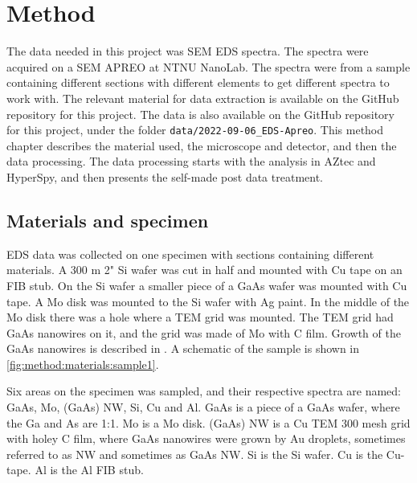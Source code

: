 \chapter{Method}
\label{chap:method}




The data needed in this project was SEM EDS spectra.
The spectra were acquired on a SEM APREO at NTNU NanoLab.
The spectra were from a sample containing different sections with different elements to get different spectra to work with.
The relevant material for data extraction is available on the GitHub repository for this project.
The data is also available on the GitHub repository for this project, under the folder \verb|data/2022-09-06_EDS-Apreo|.
This method chapter describes the material used, the microscope and detector, and then the data processing.
The data processing starts with the analysis in AZtec and HyperSpy, and then presents the self-made post data treatment.



%
%
\section{Materials and specimen}
\label{sec:method:materials}
EDS data was collected on one specimen with sections containing different materials.
A 300 \textmu m 2" Si wafer was cut in half and mounted with Cu tape on an FIB stub.
On the Si wafer a smaller piece of a GaAs wafer was mounted with Cu tape.
A Mo disk was mounted to the Si wafer with Ag paint.
In the middle of the Mo disk there was a hole where a TEM grid was mounted.
The TEM grid had GaAs nanowires on it, and the grid was made of Mo with C film.
Growth of the GaAs nanowires is described in \cite[Ch. 3]{skomedal_improving_2022}.
A schematic of the sample is shown in \cref{fig:method:materials:sample1}.

Six areas on the specimen was sampled, and their respective spectra are named: GaAs, Mo, (GaAs) NW, Si, Cu and Al.
GaAs is a piece of a GaAs wafer, where the Ga and As are 1:1.
Mo is a Mo disk.
(GaAs) NW is a Cu TEM 300 mesh grid with holey C film, where GaAs nanowires were grown by Au droplets, sometimes referred to as NW and sometimes as GaAs NW.
Si is the Si wafer.
Cu is the Cu-tape.
Al is the Al FIB stub.


